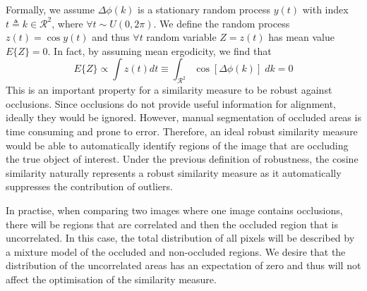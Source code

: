 Formally, we assume $\Delta \phi(k)$ is a stationary random process $y(t)$ with
index $t \triangleq k \in \mathcal{R}^2$, where $\forall t \sim U(0, 2\pi)$. We
define the random process $z(t) = \cos{y(t)}$ and thus $\forall t$ random
variable $Z = z(t)$ has mean value $E\{Z\} = 0$. In fact, by assuming mean
ergodicity, we find that
\begin{equation}\label{eq:cosine_integral}
    E\{Z\} \propto \int z(t) dt \equiv \int_{\mathcal{R}^2} \cos[\Delta \phi(k)] \; dk = 0
\end{equation}
This is an important property for a similarity measure to be robust against
occlusions. Since occlusions do not provide useful information for alignment,
ideally they would be ignored. However, manual segmentation of occluded areas is
time consuming and prone to error. Therefore, an ideal robust similarity measure
would be able to automatically identify regions of the image that are occluding
the true object of interest. Under the previous definition of robustness, the
cosine similarity naturally represents a robust similarity measure as it
automatically suppresses the contribution of outliers.

In practise, when comparing two images where one image contains occlusions,
there will be regions that are correlated and then the occluded region that is
uncorrelated. In this case, the total distribution of all pixels will be
described by a mixture model of the occluded and non-occluded regions. We desire
that the distribution of the uncorrelated areas has an expectation of zero and
thus will not affect the optimisation of the similarity measure.
